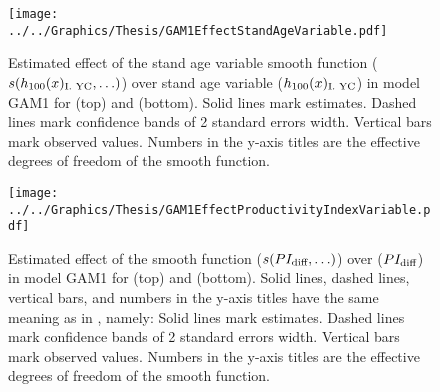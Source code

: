 \begin{figure}[h]
  \centering
  \texttt{[image: ../../Graphics/Thesis/GAM1EffectStandAgeVariable.pdf]}
  \caption{Estimated effect of the stand age variable smooth function (\(s(h_{100}(x)_{\text{I. YC}}{}, \ldots)\)) over stand age variable (\(h_{100}(x)_{\text{I. YC}}{}\)) in model GAM1 for \Beech{} (top) and \Spruce{} (bottom).  Solid lines mark estimates.  Dashed lines mark confidence bands of 2 standard errors width.  Vertical bars mark observed values.  Numbers in the y-axis titles are the effective degrees of freedom of the smooth function.}
  \label{fig:GAM1EffectStandAgeVariable}
\end{figure}

\begin{figure}[h]
  \centering
  \texttt{[image: ../../Graphics/Thesis/GAM1EffectProductivityIndexVariable.pdf]}
  \caption{Estimated effect of the \ProductivityIndexVariableText{} smooth function (\(s(PI_{\text{diff}}{}, \ldots)\)) over \ProductivityIndexVariableText{} (\(PI_{\text{diff}}{}\)) in model GAM1 for \Beech{} (top) and \Spruce{} (bottom).  Solid lines, dashed lines, vertical bars, and numbers in the y-axis titles have the same meaning as in , namely:  Solid lines mark estimates.  Dashed lines mark confidence bands of 2 standard errors width.  Vertical bars mark observed values.  Numbers in the y-axis titles are the effective degrees of freedom of the smooth function.}
  \label{fig:GAM1EffectProductivityIndexVariable}
\end{figure}



\clearpage{}

